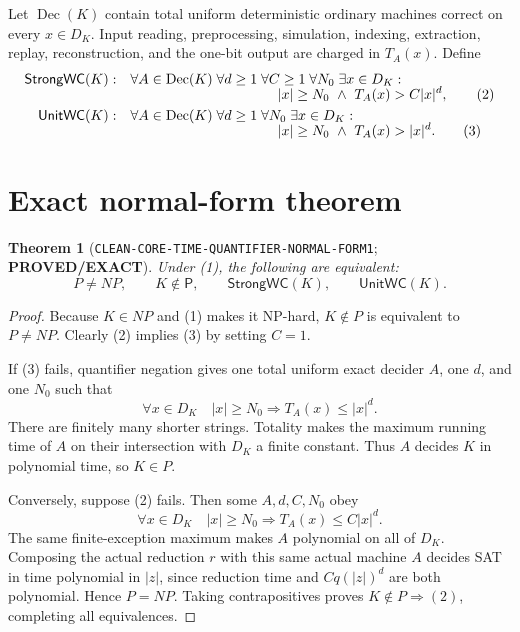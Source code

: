 \documentclass[11pt]{article}
\newtheorem{theorem}{Theorem}
\newcommand{\Pclass}{\mathsf P}
\newcommand{\EXACT}{\textbf{PROVED/EXACT}}
\begin{document}
Let \(\operatorname{Dec}(K)\) contain total uniform deterministic ordinary
machines correct on every \(x\in D_K\).  Input reading, preprocessing,
simulation, indexing, extraction, replay, reconstruction, and the one-bit
output are charged in \(T_A(x)\).  Define
\begin{align}
 \mathsf{StrongWC}(K):\quad
 &\forall A\in\operatorname{Dec}(K)\;\forall d\ge1\;
   \forall C\ge1\;\forall N_0\;\exists x\in D_K:\nonumber\\[-2mm]
 &\hspace{37mm}|x|\ge N_0\ \land\ T_A(x)>C|x|^d,          \tag{2}\\
 \mathsf{UnitWC}(K):\quad
 &\forall A\in\operatorname{Dec}(K)\;\forall d\ge1\;
   \forall N_0\;\exists x\in D_K:\nonumber\\[-2mm]
 &\hspace{37mm}|x|\ge N_0\ \land\ T_A(x)>|x|^d.          \tag{3}
\end{align}

\section{Exact normal-form theorem}

\begin{theorem}[\texttt{CLEAN-CORE-TIME-QUANTIFIER-NORMAL-FORM1}; \EXACT]
Under (1), the following are equivalent:
\[
 P\ne NP,
 \qquad K\notin\Pclass,
 \qquad \mathsf{StrongWC}(K),
 \qquad \mathsf{UnitWC}(K).                               \tag{4}
\]
\end{theorem}

\begin{proof}
Because \(K\in NP\) and (1) makes it NP-hard, \(K\notin P\) is equivalent to
\(P\ne NP\).  Clearly (2) implies (3) by setting \(C=1\).

If (3) fails, quantifier negation gives one total uniform exact decider
\(A\), one \(d\), and one \(N_0\) such that
\[
 \forall x\in D_K\quad |x|\ge N_0\Longrightarrow T_A(x)\le |x|^d. \tag{5}
\]
There are finitely many shorter strings.  Totality makes the maximum running
time of \(A\) on their intersection with \(D_K\) a finite constant.  Thus
\(A\) decides \(K\) in polynomial time, so \(K\in P\).

Conversely, suppose (2) fails.  Then some \(A,d,C,N_0\) obey
\[
 \forall x\in D_K\quad |x|\ge N_0\Longrightarrow
 T_A(x)\le C|x|^d.                                         \tag{6}
\]
The same finite-exception maximum makes \(A\) polynomial on all of \(D_K\).
Composing the actual reduction \(r\) with this same actual machine \(A\)
decides SAT in time polynomial in \(|z|\), since reduction time and
\(Cq(|z|)^d\) are both polynomial.  Hence \(P=NP\).  Taking contrapositives
proves \(K\notin P\Rightarrow(2)\), completing all equivalences.
\end{proof}
\end{document}
